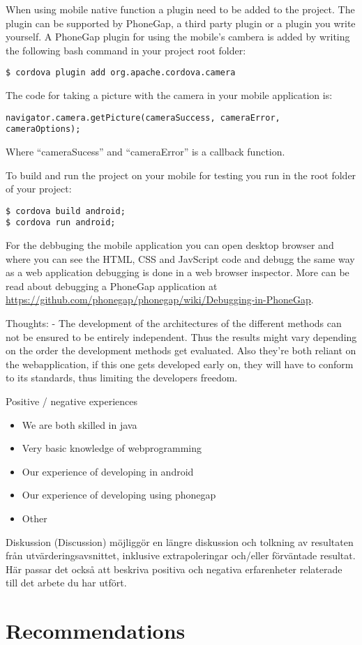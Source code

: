 When using mobile native function a plugin need to be added to the project. The plugin can be supported by PhoneGap, a third party plugin or a plugin you write yourself. A PhoneGap plugin for using the mobile’s cambera is added by writing the following bash command in your project root folder:
\begin{verbatim}
$ cordova plugin add org.apache.cordova.camera
\end{verbatim}
The code for taking a picture with the camera in your mobile application is:
\begin{verbatim}
navigator.camera.getPicture(cameraSuccess, cameraError, cameraOptions);
\end{verbatim}
Where “cameraSucess” and “cameraError” is a callback function. 

To build and run the project on your mobile for testing you run in the root folder of your project:
\begin{verbatim}
$ cordova build android; 
$ cordova run android;
\end{verbatim}

For the debbuging the mobile application you can open desktop browser and where you can see the HTML, CSS and JavScript code and debugg the same way as a web application debugging is done in a web browser inspector. More can be read about debugging a PhoneGap application at \url{https://github.com/phonegap/phonegap/wiki/Debugging-in-PhoneGap}.



Thoughts:
 - The development of the architectures of the different methods can not be ensured to be entirely independent. Thus the results might vary depending on the order the development methods get evaluated. Also they're both reliant on the webapplication, if this one gets developed early on, they will have to conform to its standards, thus limiting the developers freedom. 

Positive / negative experiences
\begin{itemize}
    \item We are both skilled in java
    \item Very basic knowledge of webprogramming
    \item Our experience of developing in android
    \item Our experience of developing using phonegap
    \item Other
\end{itemize}

Diskussion (Discussion) möjliggör en längre diskussion och tolkning av resultaten från utvärderingsavsnittet, inklusive extrapoleringar och/eller förväntade resultat. Här passar det också att beskriva positiva och negativa erfarenheter relaterade till det arbete du har utfört.

\section{Recommendations}
\fi